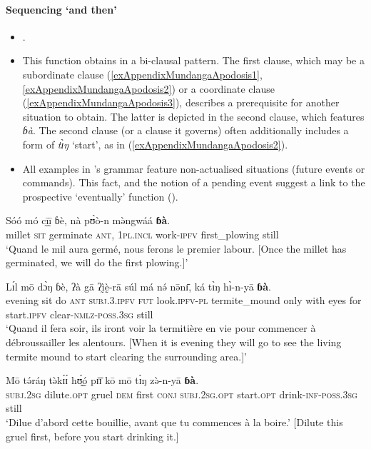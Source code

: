 \paragraph{Sequencing \lq{}and then\rq}\label{appendixMundangEventSequencing}
\begin{itemize}
	\item \textcite[382–383]{Elders2000}.
	\item This function obtains in a bi-clausal pattern. The first clause, which may be a subordinate clause (\ref{exAppendixMundangaApodosis1}, \ref{exAppendixMundangaApodosis2}) or a coordinate clause (\ref{exAppendixMundangaApodosis3}), describes a prerequisite for another situation to obtain. The latter is depicted in the second clause, which features  \textit{ɓà}. The second clause (or a clause it governs) often additionally includes a form of \textit{tɪ̀ŋ} \lq start\rq{}, as in (\ref{exAppendixMundangaApodosis2}).
	\item All examples in \citeauthor{Elders2000}'s grammar feature non-actualised situations (future events or commands). This fact, and the notion of a pending event suggest a link to the prospective \lq eventually\rq{ }function ().
\end{itemize}\largerpage

\begin{exe}
	\ex\label{exAppendixMundangaApodosis1}
	\gll Sóó mó cḭ̄ḭ̄ ɓè, nà pʊ̀ò-n mə̀ngwáá \textbf{ɓà}.\\
millet \textsc{sit} germinate \textsc{ant}, 1\textsc{pl}.\textsc{incl} work-\textsc{ipfv} first\_plowing still\\
\glt \lq Quand le mil aura germé, nous ferons le premier labour. [Once the millet has germinated, we will do the first plowing.]\rq{ }\parencite[383]{Elders2000}

	\ex\label{exAppendixMundangaApodosis2}
	\gll Lɪ́l mō dɔ̀ŋ ɓè, ʔà gā ʔḭ̀ḛ̀-rā súl má nə́ nə̄nɪ̄, ká tɪ̀ŋ hɪ̀-n-yā \textbf{ɓà}.\\
	evening sit do \textsc{ant} \textsc{subj}.3.\textsc{ipfv} \textsc{fut} look.\textsc{ipfv}-\textsc{pl} termite\_mound only with eyes for start.\textsc{ipfv} clear-\textsc{nmlz}-\textsc{poss}.3\textsc{sg} still\\
	\glt \lq Quand il fera soir, ils iront voir la termitière en vie pour commencer à débroussailler les alentours. [When it is evening they will go to see the living termite mound to start clearing the surrounding area.]\rq{ }\parencite[383]{Elders2000}
	
	\ex\label{exAppendixMundangaApodosis3}
	\gll Mō tə́ráŋ tə̀kɪ́ɪ́ hʊ̰́ó̰ pɪ̄ɪ̄ kō mō tɪ̀ŋ zə̀-n-yā \textbf{ɓà}.\\
	\textsc{subj}.2\textsc{sg} dilute.\textsc{opt} gruel \textsc{dem} first \textsc{conj} \textsc{subj}.2\textsc{sg}.\textsc{opt} start.\textsc{opt} drink-\textsc{inf}-\textsc{poss}.3\textsc{sg} still\\
	\glt \lq Dilue d’abord cette bouillie, avant que tu commences à la boire.' [Dilute this gruel first, before you start drinking it.] \parencite[384]{Elders2000}
\end{exe}

